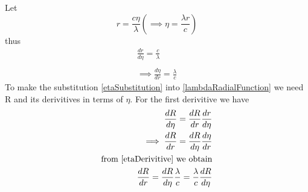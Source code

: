 \documentclass[10pt]{article}
\numberwithin{equation}{section}
\begin{document}
		\section{}
		Let		
		\begin{equation}
			r = \frac{c \eta}{\lambda} \left(\implies \eta = \frac{\lambda r}{c}\right) \label{etaSubstitution}
		\end{equation}
		thus
		\begin{equation}\label{etaDerivitive}
			\begin{split}
				\frac{dr}{d \eta} = \frac{c}{\lambda}\\\\
				\implies \frac{d \eta}{dr} = \frac{\lambda}{c} 
			\end{split}
		\end{equation}
		To make the substitution \ref{etaSubstitution} into \ref{lambdaRadialFunction} we need R and its derivitives in terms of \(\eta\).
		For the first derivitive we have
		\begin{align}\label{R'Eta}
			\begin{split}
				\frac{dR}{d \eta} = \frac{dR}{dr} \frac{dr}{d \eta}\\
				\implies \frac{dR}{dr} = \frac{dR}{d \eta} \frac{d \eta}{dr}\\
				\text{from \ref{etaDerivitive} we obtain}\\ 
				\frac{dR}{dr} = \frac{dR}{d \eta} \frac{\lambda}{c} = \frac{\lambda}{c} \frac{dR}{d \eta}\\
			\end{split}
		\end{align}
\end{document}

